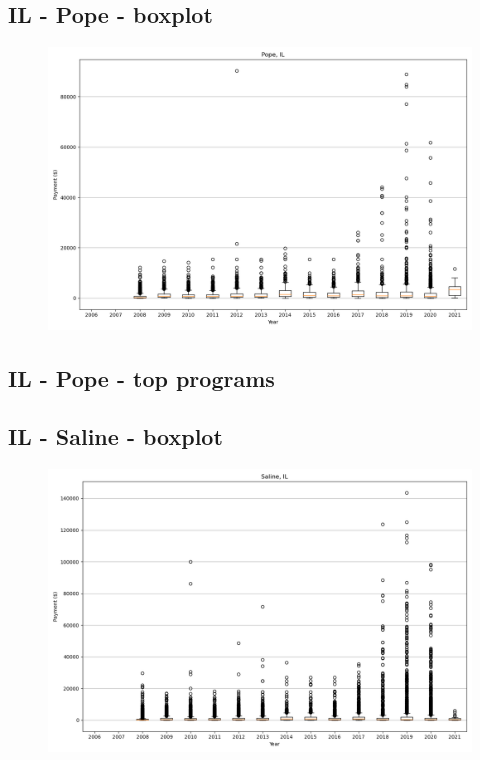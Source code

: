 \subsection*{IL - Pope - boxplot}
\begin{figure}[h]
\centering
\includegraphics[width=7in]{../output/boxplots/counties/Pope-IL_boxplot.png}
\end{figure}


\subsection*{IL - Pope - top programs}

\newpage
\subsection*{IL - Saline - boxplot}
\begin{figure}[h]
\centering
\includegraphics[width=7in]{../output/boxplots/counties/Saline-IL_boxplot.png}
\end{figure}


